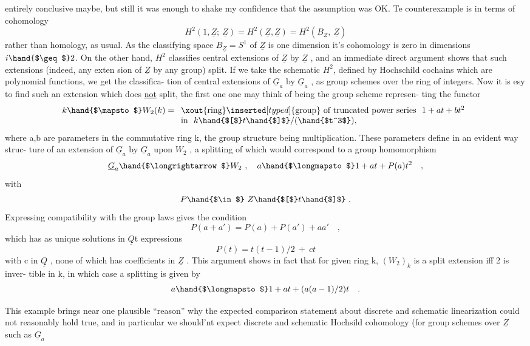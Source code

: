 entirely conclusive maybe,  but still it was enough to shake my confidence
that the assumption was OK.  Te counterexample is in terms of cohomology
\[ H^2(1,\underline{Z};\ \underline{Z}) = H^2(\underline{Z},\underline{Z}) = H^2(B_{\underline{Z}},\ \underline{Z}) \]
rather than homology, as usual.   As the classifying space $B_{\underline{Z}} = S^1$ of $\underline{Z}$
is one dimension it's cohomology is zero in dimensions $i \hand{$\geq$} 2$.  On the 
other hand,  $H^2$ classifies central extensions of $\underline{Z}$ by $\underline{Z}$ ,  and an
immediate direct argument shows  that such extensions (indeed, any exten%
\hand{-}sion of $\underline{Z}$ by any group) split.  If we take the schematic $H^2$,  defined by
Hochschild cochains which are polynomial functions,  we get the classifica-%
tion of central extensions of $\underline{G}_a$ by $\underline{G}_a$  ,  as group schemes over
the ring of integers.  Now it is esy to find such an extension which does
\uline{not} split,  the first one one may think of being the group scheme represen-%
ting the functor
\[ k \hand{$\mapsto$} W_2(k) = \begin{array}[t]{l} \xout{\text{ring}}\inserted[typed]{\text{group}}\text{ of truncated power series }\ 1+at+bt^2 \\ \text{in }\ k\hand{$[$}t\hand{$]$}/(\hand{$t^3$}), \end{array} \]
where a,b are parameters in the commutative ring k,  the group structure
being multiplication.  These parameters define in an evident way  struc-%
ture of an extension of $\underline{G}_a$ by $\underline{G}_a$ upon $W_2$ ,  a splitting of which would
correspond to a group homomorphism
\[ \underline{G}_a \hand{$\longrightarrow$} W_2 \ , \quad a \hand{$\longmapsto$} 1 + at + P(a)t^2 \quad , \]
with
\[ P \hand{$\in$}\ Z\hand{$[$}t\hand{$]$} \ . \]
Expressing compatibility with the group laws gives the condition
\[ P(a+a') = P(a) + P(a') + aa' \quad , \]
which has\hand{,} as unique solutions  in  $\underline{Q}$\hand{$[$}t\hand{$]$}\hand{,} expressions
\[ P(t) = t(t-1)/2 \ + \ ct \]
with c in $\underline{Q}$ ,  none of which has coefficients in $\underline{Z}$ . \deleted{\unsure{(}}This argument shows
in fact that for given ring k, $(W_2)_k$ is a split extension iff 2 is inver-%
tible in k,  in which case a splitting is given by
\[ a \hand{$\longmapsto$} 1 + at +(a(a-1)/2)t \quad . \]

This example brings near one plausible ``reason'' why the expected
comparison statement about discrete and schematic linearization could not
reasonably hold true,  and in particular we should'nt expect discrete and
schematic Hochsild cohomology (for group schemes over $\underline{Z}$  such as $\underline{G}_a$

